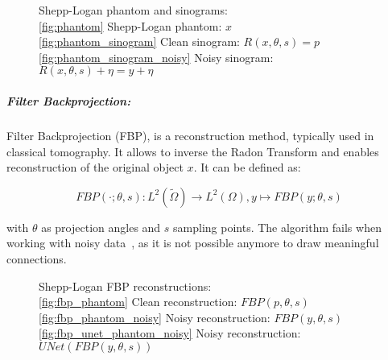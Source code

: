 \begin{figure}[H]
    \label{fig:phantom_and_sinos}
    \hfill
    \hfill
    \hfill
    \hfill
	\caption{Shepp-Logan phantom and sinograms: \\
    \ref{fig:phantom} Shepp-Logan phantom: $x$ \\
    \ref{fig:phantom_sinogram} Clean sinogram: $R(x, \theta, s) = p$ \\
    \ref{fig:phantom_sinogram_noisy} Noisy sinogram: $R(x, \theta, s) + \eta = y + \eta$ 
    }
\end{figure}

\subparagraph{Filter Backprojection:}
Filter Backprojection \cite{tomographicReconstruction} (FBP), 
is a reconstruction method, typically used in classical tomography.
It allows to inverse the Radon Transform and enables reconstruction of the original object $x$.
It can be defined as:

\begin{equation}
    \label{eq:fbp}
    \textit{FBP}(\cdot; \theta, s) : L^2(\tilde{\Omega}) \to L^2(\Omega), y \mapsto \textit{FBP}(y; \theta, s)
\end{equation}

with $\theta$ as projection angles and $s$ sampling points. 
The algorithm fails when working with noisy data~\cite{cryoEmMath2}, as it is not possible anymore to draw meaningful connections.

\begin{figure}[h]
    \label{fig:phantom_fbps}
    \hfill
    \hfill
    \hfill
    \hfill
	\caption{Shepp-Logan FBP reconstructions: \\
    \ref{fig:fbp_phantom} Clean reconstruction: $\textit{FBP}(p, \theta, s)$  \\
    \ref{fig:fbp_phantom_noisy} Noisy reconstruction: $\textit{FBP}(y, \theta, s)$ \\
    \ref{fig:fbp_unet_phantom_noisy} Noisy reconstruction: $\textit{UNet}(\textit{FBP}(y, \theta, s))$ 
    }
\end{figure}

